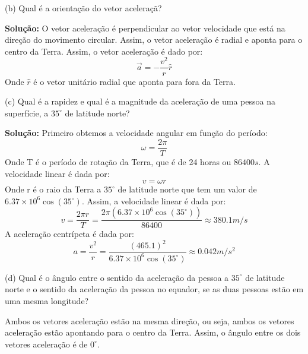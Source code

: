 \documentclass[12pt, a4paper]{article} %
\begin{document}
    (b) Qual \'e a orienta\c{c}\~ao do vetor acelera\c{c}\~a?

    \textbf{Solu\c{c}\~ao:}
    O vetor acelera\c{c}\~ao \'e perpendicular ao vetor velocidade que est\'a na dire\c{c}\~ao do movimento circular. Assim, o vetor acelera\c{c}\~ao \'e radial e aponta para o centro da Terra.
    Assim, o vetor acelera\c{c}\~ao \'e dado por:
    \begin{equation}
        \overrightarrow{a} = -\frac{v^{2}}{r}\hat{r}
    \end{equation}
    Onde $\hat{r}$ \'e o vetor unit\'ario radial que aponta para fora da Terra.
    
    (c) Qual \'e a rapidez e qual \'e a magnitude da acelera\c{c}\~ao de uma pessoa na superf\'icie, a $35^{\circ}$ de latitude norte?
    
    \textbf{Solu\c{c}\~ao:}
    Primeiro obtemos a velocidade angular em fun\c{c}\~ao do per\'iodo:
    \begin{equation}
        \omega = \frac{2\pi}{T}
    \end{equation}
    Onde T \'e o per\'iodo de rota\c{c}\~ao da Terra, que \'e de 24 horas ou $86400s$.
    A velocidade linear \'e dada por:
    \begin{equation}
        v = \omega r
    \end{equation}
    Onde r \'e o raio da Terra a $35^{\circ}$ de latitude norte que tem um valor de $6.37 \times 10^{6} \cos(35^{\circ})$.
    Assim, a velocidade linear \'e dada por:
    \begin{equation}
        v = \frac{2\pi r}{T} = \frac{2\pi (6.37 \times 10^{6} \cos(35^{\circ}))}{86400} \approx 380.1 m/s
    \end{equation}
    A acelera\c{c}\~ao centr\'ipeta \'e dada por:
    \begin{equation}
        a = \frac{v^{2}}{r} = \frac{(465.1)^{2}}{6.37 \times 10^{6} \cos(35^{\circ})} \approx 0.042 m/s^{2}
    \end{equation}
    
    (d) Qual \'e o \^angulo entre o sentido da acelera\c{c}\~ao da pessoa a $35^{\circ}$ de latitude norte e o sentido da acelera\c{c}\~ao da pessoa no equador, se as duas pessoas est\~ao em uma mesma longitude?

    Ambos os vetores acelera\c{c}\~ao est\~ao na mesma dire\c{c}\~ao, ou seja, ambos os vetores acelera\c{c}\~ao est\~ao apontando para o centro da Terra. Assim, o \^angulo entre os dois vetores acelera\c{c}\~ao \'e de $0^{\circ}$.
\end{document}
